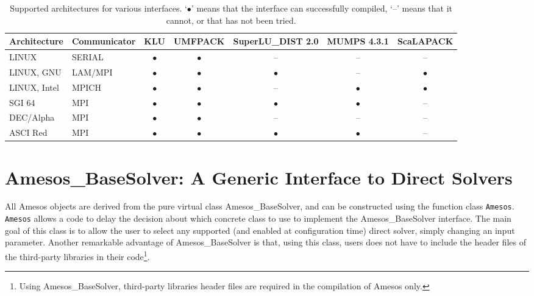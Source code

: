 \documentclass[11pt]{SANDreport}
\begin{document}
\begin{sidewaystable}[tbhp]
  \centering
  \begin{tabular}{| l  l | c | c | c | c | c | }
    \hline
    Architecture & Communicator & KLU & UMFPACK & SuperLU\_DIST 2.0 &
    MUMPS 4.3.1 & ScaLAPACK    \\
    \hline
    LINUX & SERIAL & $\bullet$ & $\bullet$ & -- & -- & -- \\
    LINUX, GNU & LAM/MPI  &$\bullet$  & $\bullet$ & $\bullet$
    & -- & $\bullet$ \\
    LINUX, Intel & MPICH  &$\bullet$  & $\bullet$ & -- 
    & $\bullet$ & $\bullet$ \\
    SGI 64 & MPI & $\bullet$ & $\bullet$ & $\bullet$ & $\bullet$ & -- \\
    DEC/Alpha & MPI & $\bullet$ & $\bullet$ & -- & -- & -- \\
    ASCI Red & MPI & $\bullet$ & $\bullet$ & $\bullet$ & $\bullet$ & -- \\
    \hline
  \end{tabular}
  \caption{Supported architectures for various interfaces. 
  `$\bullet$' means that the interface can successfully compiled, 
  `--' means that it cannot, or that has not been tried.}
  \label{tab:arch}
\end{sidewaystable}


\section{Amesos\_BaseSolver: A Generic Interface to Direct Solvers}
\label{sec:amesos_generic}

All Amesos objects are derived from the pure virtual class
Amesos\_BaseSolver, and can be constructed using the function class
\verb!Amesos!.  \verb!Amesos! allows a code to delay the decision about
which concrete class to use to implement the Amesos\_BaseSolver
interface. The main goal of this class is to allow the user to select
any supported (and enabled at configuration time) direct solver, simply
changing an input parameter. Another remarkable advantage of
Amesos\_BaseSolver is that, using this class, users does not have to
include the header files of the third-party libraries in their
code\footnote{Using Amesos\_BaseSolver, third-party libraries header
  files are required in the compilation of Amesos only.}.
\end{document}
